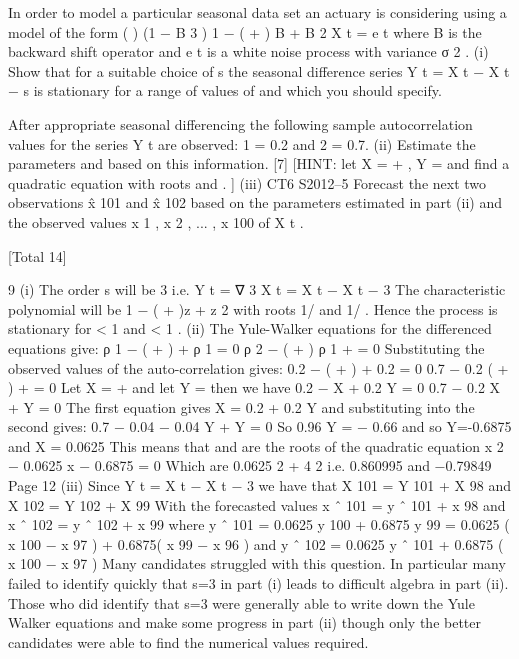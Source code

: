 In order to model a particular seasonal data set an actuary is considering using a
model of the form
(
)
(1 − B 3 ) 1 − ( \alpha  + \beta  ) B + \alpha \beta  B 2 X t = e t
where B is the backward shift operator and e t is a white noise process with variance
σ 2 .
(i)
Show that for a suitable choice of s the seasonal difference series
Y t = X t − X t − s is stationary for a range of values of \alpha  and \beta  which you should
specify.

After appropriate seasonal differencing the following sample autocorrelation values
for the series Y t are observed: \hat{\rho} 1 = 0.2 and \hat{\rho} 2 = 0.7.
(ii)
Estimate the parameters \alpha  and \beta  based on this information.
[7]
[HINT: let X = \alpha  + \beta , Y = \alpha \beta  and find a quadratic equation with roots
\alpha  and \beta . ]
(iii)
CT6 S2012–5
Forecast the next two observations x̂ 101 and x̂ 102 based on the parameters
estimated in part (ii) and the observed values x 1 , x 2 , ... , x 100 of X t .

[Total 14]



9
(i)
The order s will be 3 i.e. Y t = ∇ 3 X t = X t − X t − 3
The characteristic polynomial will be 1 − ( \alpha  + \beta  )z + \alpha \beta  z 2 with roots 1/ \alpha  and
1/ \beta  .
Hence the process is stationary for \alpha  < 1 and \beta  < 1 .
(ii)
The Yule-Walker equations for the differenced equations give:
ρ 1 − ( \alpha  + \beta  ) + \alpha \beta ρ 1 = 0
ρ 2 − ( \alpha  + \beta  ) ρ 1 + \alpha \beta  = 0
Substituting the observed values of the auto-correlation gives:
0.2 − ( \alpha  + \beta  ) + 0.2 \alpha \beta  = 0
0.7 − 0.2 ( \alpha  + \beta  ) + \alpha \beta  = 0
Let X = \alpha  + \beta  and let Y = \alpha \beta  then we have
0.2 − X + 0.2 Y = 0
0.7 − 0.2 X + Y = 0
The first equation gives X = 0.2 + 0.2 Y and substituting into the second gives:
0.7 − 0.04 − 0.04 Y + Y = 0
So 0.96 Y = − 0.66 and so Y=-0.6875 and X = 0.0625
This means that \alpha  and \beta  are the roots of the quadratic equation
x 2 − 0.0625 x − 0.6875 = 0
Which are
0.0625  2 + 4 
2
i.e. 0.860995 and −0.79849
Page 12
(iii)
Since Y t = X t − X t − 3 we have that
X 101 = Y 101 + X 98
and
X 102 = Y 102 + X 99
With the forecasted values
x ˆ 101 = y ˆ 101 + x 98
and
x ˆ 102 = y ˆ 102 + x 99
where
y ˆ 101 = 0.0625 y 100 + 0.6875 y 99 = 0.0625 ( x 100 − x 97 ) + 0.6875( x 99 − x 96 )
and
y ˆ 102 = 0.0625 y ˆ 101 + 0.6875 ( x 100 − x 97 )
Many candidates struggled with this question. In particular many failed to identify quickly
that s=3 in part (i) leads to difficult algebra in part (ii). Those who did identify that s=3
were generally able to write down the Yule Walker equations and make some progress in part
(ii) though only the better candidates were able to find the numerical values required.
